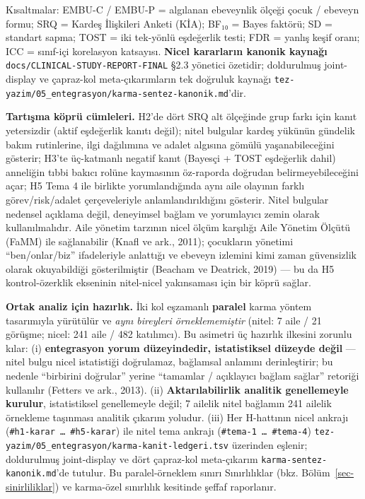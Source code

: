\documentclass[
  turkish,
  a4paper,
  DIV=11,
  numbers=noendperiod]{scrreprt}
\begin{document}
Kısaltmalar: EMBU-C / EMBU-P = algılanan ebeveynlik ölçeği çocuk /
ebeveyn formu; SRQ = Kardeş İlişkileri Anketi (KİA); BF₁₀ = Bayes
faktörü; SD = standart sapma; TOST = iki tek-yönlü eşdeğerlik testi; FDR
= yanlış keşif oranı; ICC = sınıf-içi korelasyon katsayısı.
\textbf{Nicel kararların kanonik kaynağı}
\texttt{docs/CLINICAL-STUDY-REPORT-FINAL} §2.3 yönetici özetidir;
doldurulmuş joint-display ve çapraz-kol meta-çıkarımların tek doğruluk
kaynağı \texttt{tez-yazim/05\_entegrasyon/karma-sentez-kanonik.md}'dir.

\textbf{Tartışma köprü cümleleri.} H2'de dört SRQ alt ölçeğinde grup
farkı için kanıt yetersizdir (aktif eşdeğerlik kanıtı değil); nitel
bulgular kardeş yükünün gündelik bakım rutinlerine, ilgi dağılımına ve
adalet algısına gömülü yaşanabileceğini gösterir; H3'te üç-katmanlı
negatif kanıt (Bayesçi + TOST eşdeğerlik dahil) anneliğin tıbbi bakıcı
rolüne kaymasının öz-raporda doğrudan belirmeyebileceğini açar; H5 Tema
4 ile birlikte yorumlandığında aynı aile olayının farklı
görev/risk/adalet çerçeveleriyle anlamlandırıldığını gösterir. Nitel
bulgular nedensel açıklama değil, deneyimsel bağlam ve yorumlayıcı zemin
olarak kullanılmalıdır. Aile yönetim tarzının nicel ölçüm karşılığı Aile
Yönetim Ölçütü (FaMM) ile sağlanabilir (Knafl ve ark., 2011); çocukların
yönetimi ``ben/onlar/biz'' ifadeleriyle anlattığı ve ebeveyn izlemini
kimi zaman güvensizlik olarak okuyabildiği gösterilmiştir (Beacham ve
Deatrick, 2019) --- bu da H5 kontrol-özerklik ekseninin nitel-nicel
yakınsaması için bir köprü sağlar.

\textbf{Ortak analiz için hazırlık.} İki kol eşzamanlı \textbf{paralel}
karma yöntem tasarımıyla yürütülür ve \emph{aynı bireyleri
örneklememiştir} (nitel: 7 aile / 21 görüşme; nicel: 241 aile / 482
katılımcı). Bu asimetri üç hazırlık ilkesini zorunlu kılar: (i)
\textbf{entegrasyon yorum düzeyindedir, istatistiksel düzeyde değil} ---
nitel bulgu nicel istatistiği doğrulamaz, bağlamsal anlamını
derinleştirir; bu nedenle ``birbirini doğrular'' yerine ``tamamlar /
açıklayıcı bağlam sağlar'' retoriği kullanılır (Fetters ve ark., 2013).
(ii) \textbf{Aktarılabilirlik analitik genellemeyle kurulur},
istatistiksel genellemeyle değil; 7 ailelik nitel bağlamın 241 ailelik
örnekleme taşınması analitik çıkarım yoludur. (iii) Her H-hattının nicel
ankrajı (\texttt{\#h1-karar\ …\ \#h5-karar}) ile nitel tema ankrajı
(\texttt{\#tema-1\ …\ \#tema-4})
\texttt{tez-yazim/05\_entegrasyon/karma-kanit-ledgeri.tsv} üzerinden
eşlenir; doldurulmuş joint-display ve dört çapraz-kol meta-çıkarım
\texttt{karma-sentez-kanonik.md}'de tutulur. Bu paralel-örneklem sınırı
Sınırlılıklar (bkz. Bölüm~\ref{sec-sinirliliklar}) ve karma-özel
sınırlılık kesitinde şeffaf raporlanır.
\end{document}
